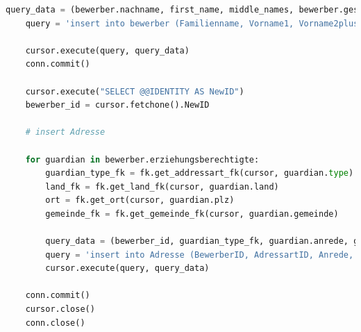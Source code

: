 \begin{lstlisting}[language=Python,caption=Code for entering the data into the Access database]
    query_data = (bewerber.nachname, first_name, middle_names, bewerber.geschlecht, bewerber.geburtsdatum, geburtsstaat_fk, staatsbuergerschaft_fk, religionsbekenntnis_fk, muttersprache_fk, alltagssprache_fk, bewerber.svn_kurz, '', '', bewerber.telefonnummer, desired_department_fk, alternative_department_fk, alternative_department2_fk, bewerber.vorschule_jahre, bewerber.volkschule_jahre, bewerber.mittelschule_jahre, bewerber.ahs_jahre, bewerber.poly_jahre, bewerber.sonstige_jahre, bewerber.herkunftsschule_name, herkungtsschultyp_fk, bewerber.geschwister_an_der_schule, verhalten7sst_fk, bewerber.original_jahreszeugnis)
    query = 'insert into bewerber (Familienname, Vorname1, Vorname2plus, Geschlecht, Geburtsdatum, Geburtsstaat_FK, Staatsbuergerschaft_FK, Religionsbekenntnis_FK, Muttersprache_FK, AlltagsspracheA_FK, SVNR_kurz, Anmerkung, Schueler_EMail, TelefonNr1_Bewerber, Wunschabteilung1, Wunschabteilung2, Wunschabteilung3, Vorbildung_Vorschule, Vorbildung_Volksschule, Vorbildung_NMS, Vorbildung_AHS, Vorbildung_Poly, Vorbildung_Sonstige, Herkunftsschule, Herkunftsschultyp, Geschwister_an_HTL, Verhalten_7SST, Original_Jahreszeugnis) values (?, ?, ?, ?, ?, ?, ?, ?, ?, ?, ?, ?, ?, ?, ?, ?, ?, ?, ?, ?, ?, ?, ?, ?, ?, ?, ?, ?)'

    cursor.execute(query, query_data)
    conn.commit()

    cursor.execute("SELECT @@IDENTITY AS NewID")
    bewerber_id = cursor.fetchone().NewID

    # insert Adresse

    for guardian in bewerber.erziehungsberechtigte:
        guardian_type_fk = fk.get_addressart_fk(cursor, guardian.type)
        land_fk = fk.get_land_fk(cursor, guardian.land)
        ort = fk.get_ort(cursor, guardian.plz)
        gemeinde_fk = fk.get_gemeinde_fk(cursor, guardian.gemeinde)

        query_data = (bewerber_id, guardian_type_fk, guardian.anrede, guardian.title, guardian.akad_grad, guardian.vorname, guardian.zweiter_vorname, guardian.nachname, guardian.akad_grad_nach, land_fk, guardian.plz, ort, gemeinde_fk, guardian.strasse, guardian.hausnummer, guardian.telefonnummer1, guardian.telefonnummer2, guardian.email, guardian.schueler_wohnt_hier, guardian.ist_erziehungsberechtigt)
        query = 'insert into Adresse (BewerberID, AdressartID, Anrede, Titel, Akad_Grad, Vorname, Vorname2, Familienname, Akad_Grad_nach, LandID, PLZ_FK, Ort, GemeindeID_FK, Strasse, Hausnummer, Adress_TelefonNr1, Adress_TelefonNr2, Adress_EMail, Schueler_wohnt_hier, Ist_erziehungsberechtigt) values (?, ?, ?, ?, ?, ?, ?, ?, ?, ?, ?, ?, ?, ?, ?, ?, ?, ?, ?, ?)'
        cursor.execute(query, query_data)

    conn.commit()
    cursor.close()
    conn.close()
\end{lstlisting}
